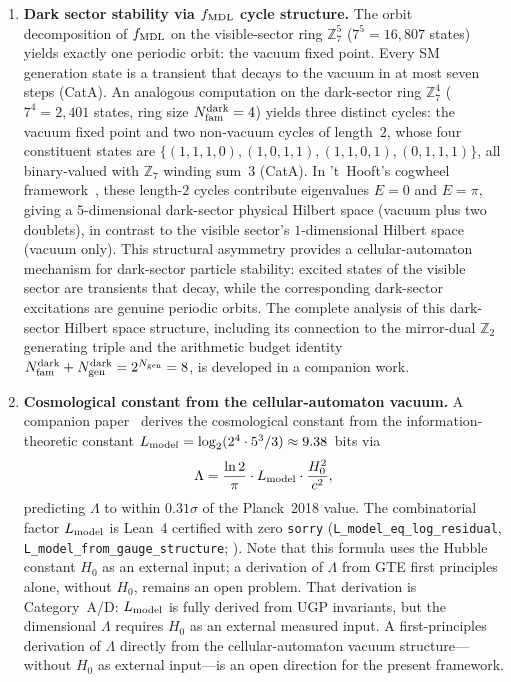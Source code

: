 \documentclass[11pt]{article}
\theoremstyle{remark}
\begin{document}
\begin{enumerate}[leftmargin=1.5em]
\item \textbf{Dark sector stability via $f_{\rm MDL}$ cycle structure.}
  The orbit decomposition of $f_{\rm MDL}$ on the visible-sector ring
  $\mathbb{Z}_7^5$ ($7^5 = 16{,}807$ states) yields exactly one periodic
  orbit: the vacuum fixed point.  Every SM generation state is a transient
  that decays to the vacuum in at most seven steps (CatA).
  An analogous computation on the dark-sector ring $\mathbb{Z}_7^4$
  ($7^4 = 2{,}401$ states, ring size $N_{\rm fam}^{\rm dark} = 4$)
  yields three distinct cycles: the vacuum fixed point and two non-vacuum
  cycles of length~$2$, whose four constituent states are
  $\{(1,1,1,0),(1,0,1,1),(1,1,0,1),(0,1,1,1)\}$, all binary-valued with
  $\mathbb{Z}_7$ winding sum~$3$ (CatA).
  In 't~Hooft's cogwheel framework~\cite{tHooft2016CA}, these length-$2$
  cycles contribute eigenvalues $E=0$ and $E=\pi$, giving a
  $5$-dimensional dark-sector physical Hilbert space (vacuum plus two
  doublets), in contrast to the visible sector's $1$-dimensional
  Hilbert space (vacuum only).
  This structural asymmetry provides a cellular-automaton mechanism for
  dark-sector particle stability: excited states of the visible sector
  are transients that decay, while the corresponding dark-sector
  excitations are genuine periodic orbits.
  The complete analysis of this dark-sector Hilbert space structure,
  including its connection to the mirror-dual $\mathbb{Z}_2$ generating
  triple and the arithmetic budget identity
  $N_{\rm fam}^{\rm dark} + N_{\rm gen}^{\rm dark} = 2^{N_{\rm gen}} = 8$,
  is developed in a companion work.

\item \textbf{Cosmological constant from the cellular-automaton vacuum.}
  A companion paper~\cite{Spivack2026_SM_UGP} derives the cosmological constant
  from the information-theoretic constant $L_{\rm model} = \log_2(2^4 \cdot 5^3/3)
  \approx 9.38$~bits via
  \begin{equation*}
    \Lambda = \frac{\ln 2}{\pi} \cdot L_{\rm model} \cdot \frac{H_0^2}{c^2},
  \end{equation*}
  predicting $\Lambda$ to within $0.31\sigma$ of the Planck~2018 value.
  The combinatorial factor $L_{\rm model}$ is Lean~4 certified with zero \texttt{sorry}
  (\texttt{L\_model\_eq\_log\_residual}, \texttt{L\_model\_from\_gauge\_structure};
  \cite{SpivackUGPFormalization,ugp-lean}).
  Note that this formula uses the Hubble constant $H_0$ as an external input;
  a derivation of $\Lambda$ from GTE first principles alone, without $H_0$,
  remains an open problem.
  That derivation is Category~A/D: $L_{\rm model}$ is fully derived from UGP invariants,
  but the dimensional $\Lambda$ requires $H_0$ as an external measured input.
  A first-principles derivation of $\Lambda$ directly from the cellular-automaton
  vacuum structure---without $H_0$ as external input---is an open direction for
  the present framework.


\end{enumerate}
\end{document}
